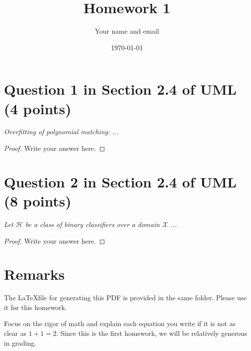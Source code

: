 \documentclass{article}
\title{Homework 1}
\author{Your name and email}
\date{\today}
\begin{document}
\maketitle

\section{Question 1 in Section 2.4 of UML (4 points)}
\emph{Overfitting of polynomial matching: ...}
\begin{proof}
    Write your answer here.
\end{proof}
\section{Question 2 in Section 2.4 of UML (8 points)}
\emph{Let $\mathcal{H}$ be a class of binary classifiers over a domain $\mathcal{X}$ ...}
\begin{proof}
    Write your answer here.
\end{proof}

\section{Remarks}
The \LaTeX file for generating this PDF is provided in the same folder. 
Please use it for this homework.

Focus on the rigor of math and explain each equation you write if it is not as clear as $1+1 = 2$.
Since this is the first homework,
we will be relatively generous in grading.
\end{document}

